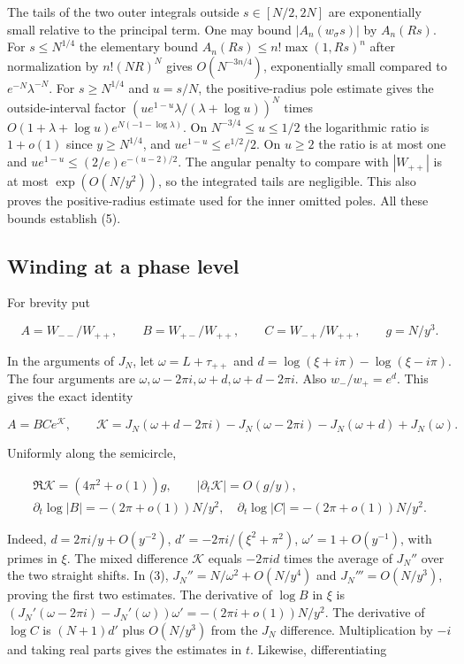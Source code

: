\documentclass[11pt]{article}
\begin{document}
The tails of the two outer integrals outside $s\in[N/2,2N]$ are exponentially small relative to the principal term. One may bound $|A_n(w_\sigma s)|$ by $A_n(Rs)$. For $s\le N^{1/4}$ the elementary bound $A_n(Rs)\le n!\max(1,Rs)^n$ after normalization by $n!(NR)^N$ gives $O(N^{-3n/4})$, exponentially small compared to $e^{-N}\lambda^{-N}$. For $s\ge N^{1/4}$ and $u=s/N$, the positive-radius pole estimate gives the outside-interval factor $(u e^{1-u}\lambda/(\lambda+\log u))^N$ times $O(1+\lambda+\log u)e^{N(-1-\log\lambda)}$. On $N^{-3/4}\le u\le1/2$ the logarithmic ratio is $1+o(1)$ since $y\ge N^{1/4}$, and $u e^{1-u}\le e^{1/2}/2$. On $u\ge2$ the ratio is at most one and $u e^{1-u}\le (2/e)e^{-(u-2)/2}$. The angular penalty to compare with $|W_{++}|$ is at most $\exp(O(N/y^2))$, so the integrated tails are negligible. This also proves the positive-radius estimate used for the inner omitted poles. All these bounds establish (5).

\subsection{Winding at a phase level}

For brevity put

\[
A=W_{--}/W_{++},\qquad B=W_{+-}/W_{++},\qquad C=W_{-+}/W_{++},\qquad g=N/y^3.
\]

In the arguments of $J_N$, let $\omega=L+\tau_{++}$ and $d=\log(\xi+i\pi)-\log(\xi-i\pi)$. The four arguments are $\omega,\omega-2\pi i,\omega+d,\omega+d-2\pi i$. Also $w_-/w_+=e^d$. This gives the exact identity

\[
A=BCe^{\mathcal K},\qquad
\mathcal K=J_N(\omega+d-2\pi i)-J_N(\omega-2\pi i)-J_N(\omega+d)+J_N(\omega).
\tag{6}
\]

Uniformly along the semicircle,

\[
\begin{gathered}\Re\mathcal K=(4\pi^2+o(1))g,\qquad
|\partial_t\mathcal K|=O(g/y),\\
\partial_t\log|B|=-(2\pi+o(1))N/y^2,\quad
\partial_t\log|C|=-(2\pi+o(1))N/y^2.\end{gathered}
\tag{7}
\]

Indeed, $d=2\pi i/y+O(y^{-2})$, $d'=-2\pi i/(\xi^2+\pi^2)$, $\omega'=1+O(y^{-1})$, with primes in $\xi$. The mixed difference $\mathcal K$ equals $-2\pi i d$ times the average of $J_N''$ over the two straight shifts. In (3), $J_N''=N/\omega^2+O(N/y^4)$ and $J_N'''=O(N/y^3)$, proving the first two estimates. The derivative of $\log B$ in $\xi$ is $(J_N'(\omega-2\pi i)-J_N'(\omega))\omega'=-(2\pi i+o(1))N/y^2$. The derivative of $\log C$ is $(N+1)d'$ plus $O(N/y^3)$ from the $J_N$ difference. Multiplication by $-i$ and taking real parts gives the estimates in $t$. Likewise, differentiating
\end{document}
